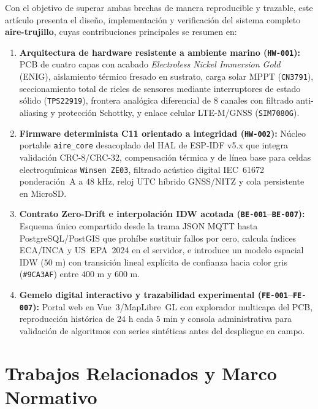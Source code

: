 \documentclass[conference]{IEEEtran}
\begin{document}
Con el objetivo de superar ambas brechas de manera reproducible y trazable, este artículo presenta el diseño, implementación y verificación del sistema completo \textbf{aire-trujillo}, cuyas contribuciones principales se resumen en:
\begin{enumerate}
    \item \textbf{Arquitectura de hardware resistente a ambiente marino (\texttt{HW-001}):} PCB de cuatro capas con acabado \emph{Electroless Nickel Immersion Gold} (ENIG), aislamiento térmico fresado en sustrato, carga solar MPPT (\texttt{CN3791}), seccionamiento total de rieles de sensores mediante interruptores de estado sólido (\texttt{TPS22919}), frontera analógica diferencial de 8 canales con filtrado anti-aliasing y protección Schottky, y enlace celular LTE-M/GNSS (\texttt{SIM7080G}).
    \item \textbf{Firmware determinista C11 orientado a integridad (\texttt{HW-002}):} Núcleo portable \texttt{aire\_core} desacoplado del HAL de ESP-IDF v5.x que integra validación CRC-8/CRC-32, compensación térmica y de línea base para celdas electroquímicas \texttt{Winsen ZE03}, filtrado acústico digital IEC~61672 ponderación~A a $48\text{ kHz}$, reloj UTC híbrido GNSS/NITZ y cola persistente en MicroSD.
    \item \textbf{Contrato Zero-Drift e interpolación IDW acotada (\texttt{BE-001}--\texttt{BE-007}):} Esquema único compartido desde la trama JSON MQTT hasta PostgreSQL/PostGIS que prohíbe sustituir fallos por cero, calcula índices ECA/INCA y US~EPA~2024 en el servidor, e introduce un modelo espacial IDW ($50\text{ m}$) con transición lineal explícita de confianza hacia color gris (\texttt{\#9CA3AF}) entre $400\text{ m}$ y $600\text{ m}$.
    \item \textbf{Gemelo digital interactivo y trazabilidad experimental (\texttt{FE-001}--\texttt{FE-007}):} Portal web en Vue~3/MapLibre~GL con explorador multicapa del PCB, reproducción histórica de $24\text{ h}$ cada $5\text{ min}$ y consola administrativa para validación de algoritmos con series sintéticas antes del despliegue en campo.
\end{enumerate}

\section{Trabajos Relacionados y Marco Normativo}
\end{document}

